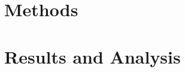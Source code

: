 \documentclass[11pt]{amsart}
\begin{document}




\section{Methods} 




\section{Results and Analysis} 
\end{document}
